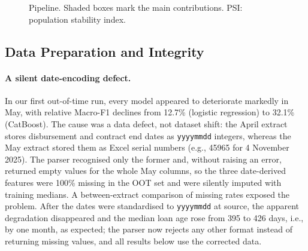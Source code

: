 \documentclass[runningheads]{llncs}
\begin{document}
\begin{figure}[t]
\centering
{}
\caption{Pipeline. Shaded boxes mark the main contributions. PSI: population stability index.}
\label{fig:pipeline}
\end{figure}

\subsection{Data Preparation and Integrity}
\label{sec:prep}

\paragraph{A silent date-encoding defect.} In our first out-of-time run, every model appeared to deteriorate markedly in May, with relative Macro-F1 declines from 12.7\% (logistic regression) to 32.1\% (CatBoost). The cause was a data defect, not dataset shift: the April extract stores disbursement and contract end dates as \texttt{yyyymmdd} integers, whereas the May extract stored them as Excel serial numbers (e.g., 45965 for 4 November 2025). The parser recognised only the former and, without raising an error, returned empty values for the whole May columns, so the three date-derived features were 100\% missing in the OOT set and were silently imputed with training medians. A between-extract comparison of missing rates exposed the problem. After the dates were standardised to \texttt{yyyymmdd} at source, the apparent degradation disappeared and the median loan age rose from 395 to 426 days, i.e., by one month, as expected; the parser now rejects any other format instead of returning missing values, and all results below use the corrected data.
\end{document}
